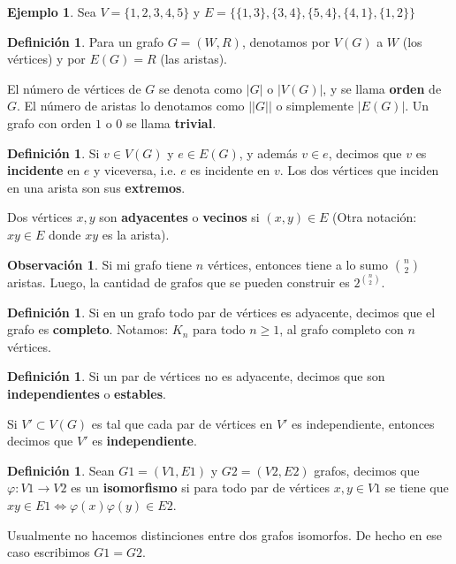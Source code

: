 \documentclass[12pt]{report}
\theoremstyle{plain}
\theoremstyle{definition}
\newtheorem{definition}[theorem]{Definición}
\newtheorem{example}[theorem]{Ejemplo}
\newtheorem{obs}[theorem]{Observación}
\newcommand{\abs}[1]{\left \vert #1 \right \vert}
\newcommand{\Abs}[1]{\left \vert \left \vert #1 \right \vert \right \vert}
\begin{document}
\begin{example}
Sea $V = \{ 1,2,3,4,5\}$ y $E = \{ \{1,3\} , \{3,4\} , \{ 5,4\} , \{4,1 \} , \{ 1,2\}\}$


\end{example}


\begin{definition}
Para un grafo $G = (W,R)$, denotamos por $V(G)$ a $W$ (los vértices) y por $E(G) = R$ (las aristas).

El número de vértices de $G$ se denota como $\abs G$ o $\abs{V(G)}$, y se llama \textbf{orden} de $G$. El número de aristas lo denotamos como $\Abs G$ o simplemente $\abs{E(G)}$. Un grafo con orden $1$ o $0$ se llama \textbf{trivial}.
\end{definition}

\begin{definition}
Si $v \in V(G)$ y $e \in E(G)$, y además $v \in e$, decimos que $v$ es \textbf{incidente} en $e$ y viceversa, i.e. $e$ es incidente en $v$. Los dos vértices que inciden en una arista son sus \textbf{extremos}.

Dos vértices $x,y$ son \textbf{adyacentes} o \textbf{vecinos} si $(x,y) \in E$ (Otra notación: $xy \in E$ donde $xy$ es la arista).
\end{definition}

\begin{obs}
Si mi grafo tiene $n$ vértices, entonces tiene a lo sumo $\binom n 2$ aristas. Luego, la cantidad de grafos que se pueden construir es $2^{\binom n 2}$.
\end{obs}

\begin{definition}
Si en un grafo todo par de vértices es adyacente, decimos que el grafo es \textbf{completo}.
Notamos: $K_n$ para todo $n \geq 1$, al grafo completo con $n$ vértices.
\end{definition}


\begin{definition}
Si un par de vértices no es adyacente, decimos que son \textbf{independientes} o \textbf{estables}.

Si $V' \subset V(G)$ es tal que cada par de vértices en $V'$ es independiente, entonces decimos que $V'$ es \textbf{independiente}.
\end{definition}

\begin{definition}
Sean $G1 = (V1,E1)$ y $G2 = (V2, E2)$ grafos, decimos que $\varphi : V1 \rightarrow V2$ es un \textbf{isomorfismo} si para todo par de vértices $x,y \in V1$ se tiene que $xy \in E1 \Leftrightarrow \varphi (x) \varphi (y) \in E2$.

Usualmente no hacemos distinciones entre dos grafos isomorfos. De hecho en ese caso escribimos $G1 = G2$.
\end{definition}
\end{document}
